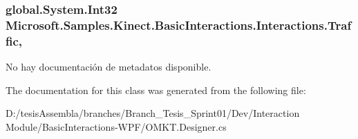 \hypertarget{class_microsoft_1_1_samples_1_1_kinect_1_1_basic_interactions_1_1_interactions_a0f6b219d330c4355fa4cb174a5b77c80}{
\subsubsection[{Traffic}]{\setlength{\rightskip}{0pt plus 5cm}global.\-System.\-Int32 Microsoft.\-Samples.\-Kinect.\-Basic\-Interactions.\-Interactions.\-Traffic\hspace{0.3cm}{\ttfamily [get]}, {\ttfamily [set]}}}\label{class_microsoft_1_1_samples_1_1_kinect_1_1_basic_interactions_1_1_interactions_a0f6b219d330c4355fa4cb174a5b77c80}


No hay documentación de metadatos disponible. 



The documentation for this class was generated from the following file\-:\begin{DoxyCompactItemize}
\item 
D\-:/tesis\-Assembla/branches/\-Branch\-\_\-\-Tesis\-\_\-\-Sprint01/\-Dev/\-Interaction Module/\-Basic\-Interactions-\/\-W\-P\-F/O\-M\-K\-T.\-Designer.\-cs\end{DoxyCompactItemize}
